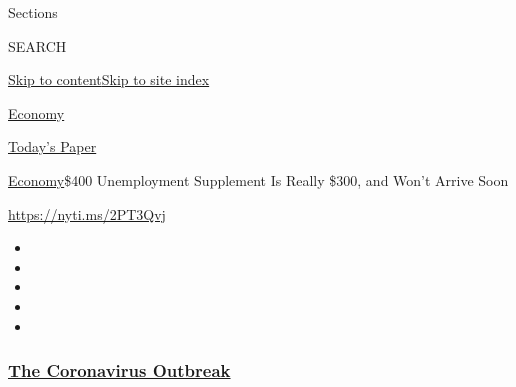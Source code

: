 Sections

SEARCH

\protect\hyperlink{site-content}{Skip to
content}\protect\hyperlink{site-index}{Skip to site index}

\href{https://www.nytimes3xbfgragh.onion/section/business/economy}{Economy}

\href{https://myaccount.nytimes3xbfgragh.onion/auth/login?response_type=cookie\&client_id=vi}{}

\href{https://www.nytimes3xbfgragh.onion/section/todayspaper}{Today's
Paper}

\href{/section/business/economy}{Economy}\textbar{}\$400 Unemployment
Supplement Is Really \$300, and Won't Arrive Soon

\url{https://nyti.ms/2PT3Qvj}

\begin{itemize}
\item
\item
\item
\item
\item
\end{itemize}

\hypertarget{the-coronavirus-outbreak}{%
\subsubsection{\texorpdfstring{\href{https://www.nytimes3xbfgragh.onion/news-event/coronavirus?name=styln-coronavirus-markets\&region=TOP_BANNER\&variant=undefined\&block=storyline_menu_recirc\&action=click\&pgtype=Article\&impression_id=61565bb0-e380-11ea-9fe8-6ddc6eaba552}{The
Coronavirus
Outbreak}}{The Coronavirus Outbreak}}\label{the-coronavirus-outbreak}}

